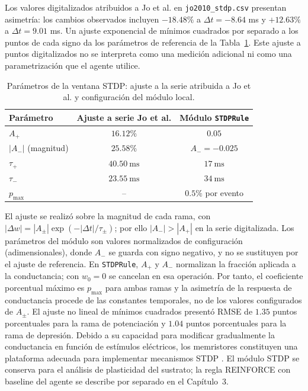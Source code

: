 Los valores digitalizados atribuidos a Jo et al. en
\texttt{jo2010\_stdp.csv} presentan asimetría: los cambios observados
incluyen $-18.48\%$ a $\Delta t=-8.64$ ms y $+12.63\%$ a
$\Delta t=9.01$ ms. Un ajuste exponencial de mínimos cuadrados por
separado a los puntos de cada signo da los parámetros de referencia
de la Tabla~\ref{tab:parametros_stdp}. Este ajuste a puntos
digitalizados no se interpreta como una medición adicional ni como
una parametrización que el agente utilice.

\begin{table}[H]
\centering
\caption{Parámetros de la ventana STDP: ajuste a la serie atribuida a Jo et al. y configuración del módulo local.}
\label{tab:parametros_stdp}
\begin{tabular}{lcc}
\hline
\textbf{Parámetro} & \textbf{Ajuste a serie Jo et al.} & \textbf{Módulo \texttt{STDPRule}} \\
\hline
$A_{+}$ & $16.12\%$ & $0.05$ \\
$|A_{-}|$ (magnitud) & $25.58\%$ & $A_{-}=-0.025$ \\
$\tau_{+}$ & $40.50~\mathrm{ms}$ & $17~\mathrm{ms}$ \\
$\tau_{-}$ & $23.55~\mathrm{ms}$ & $34~\mathrm{ms}$ \\
$p_{\max}$ & -- & $0.5\%$ por evento \\
\hline
\end{tabular}
\end{table}

El ajuste se realizó sobre la magnitud de cada rama, con
$|\Delta w|=|A_{\pm}|\exp(-|\Delta t|/\tau_{\pm})$; por ello
$|A_{-}|>|A_{+}|$ en la serie digitalizada. Los parámetros del
módulo son valores normalizados de configuración (adimensionales),
donde $A_{-}$ se guarda con signo negativo, y no se sustituyen por
el ajuste de referencia.
En \texttt{STDPRule}, $A_{+}$ y $A_{-}$ normalizan la fracción
aplicada a la conductancia; con $w_0=0$ se cancelan en esa operación.
Por tanto, el coeficiente porcentual máximo es $p_{\max}$ para ambas
ramas y la asimetría de la respuesta de conductancia procede de las
constantes temporales, no de los valores configurados de $A_{\pm}$.
El ajuste no lineal de mínimos cuadrados presentó RMSE de
$1.35$ puntos porcentuales para la rama de potenciación y
$1.04$ puntos porcentuales para la rama de depresión. Debido a su
capacidad para modificar gradualmente la conductancia en función de estímulos eléctricos,
los memristores constituyen una plataforma adecuada para implementar
mecanismos STDP \cite{2,3}. El módulo STDP se conserva para el
análisis de plasticidad del sustrato; la regla REINFORCE con baseline
del agente se describe por separado en el Capítulo~3.

